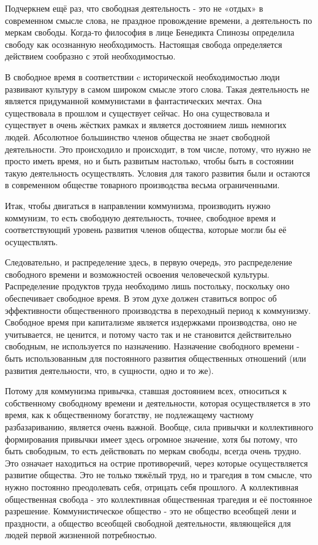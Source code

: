 \documentclass[../main]{subfiles}
\begin{document}
Подчеркнем ещё раз, что свободная деятельность - это не «отдых» в современном смысле слова, не праздное провождение времени, а деятельность по меркам свободы. Когда-то философия в лице Бенедикта Спинозы определила свободу как осознанную необходимость. Настоящая свобода определяется действием сообразно с этой необходимостью.

В свободное время в соответствии c исторической необходимостью люди развивают культуру в самом широком смысле этого слова. Такая деятельность не является придуманной коммунистами в фантастических мечтах. Она существовала в прошлом и существует сейчас. Но она существовала и существует в очень жёстких рамках и является достоянием лишь немногих людей. Абсолютное большинство членов общества не знает свободной деятельности. Это происходило и происходит, в том числе, потому, что нужно не просто иметь время, но и быть развитым настолько, чтобы быть в состоянии такую деятельность осуществлять. Условия для такого развития были и остаются в современном обществе товарного производства весьма ограниченными.

Итак, чтобы двигаться в направлении коммунизма, производить нужно коммунизм, то есть свободную деятельность, точнее, свободное время и соответствующий уровень развития членов общества, которые могли бы её осуществлять.

Следовательно, и распределение здесь, в первую очередь, это распределение свободного времени и возможностей освоения человеческой культуры. Распределение продуктов труда необходимо лишь постольку, поскольку оно обеспечивает свободное время. В этом духе должен ставиться вопрос об эффективности общественного производства в переходный период к коммунизму. Свободное время при капитализме является издержками производства, оно не учитывается, не ценится, и потому часто так и не становится действительно свободным, не используется по назначению. Назначение свободного времени - быть использованным для постоянного развития общественных отношений (или развития деятельности, что, в сущности, одно и то же).

Потому для коммунизма привычка, ставшая достоянием всех, относиться к собственному свободному времени и деятельности, которая осуществляется в это время, как к общественному богатству, не подлежащему частному разбазариванию, является очень важной. Вообще, сила привычки и коллективного формирования привычки имеет здесь огромное значение, хотя бы потому, что быть свободным, то есть действовать по меркам свободы, всегда очень трудно. Это означает находиться на острие противоречий, через которые осуществляется развитие общества. Это не только тяжёлый труд, но и трагедия в том смысле, что нужно постоянно преодолевать себя, отрицать себя прошлого. А коллективная общественная свобода - это коллективная общественная трагедия и её постоянное разрешение. Коммунистическое общество - это не общество всеобщей лени и праздности, а общество всеобщей свободной деятельности, являющейся для людей первой жизненной потребностью.
\end{document}
